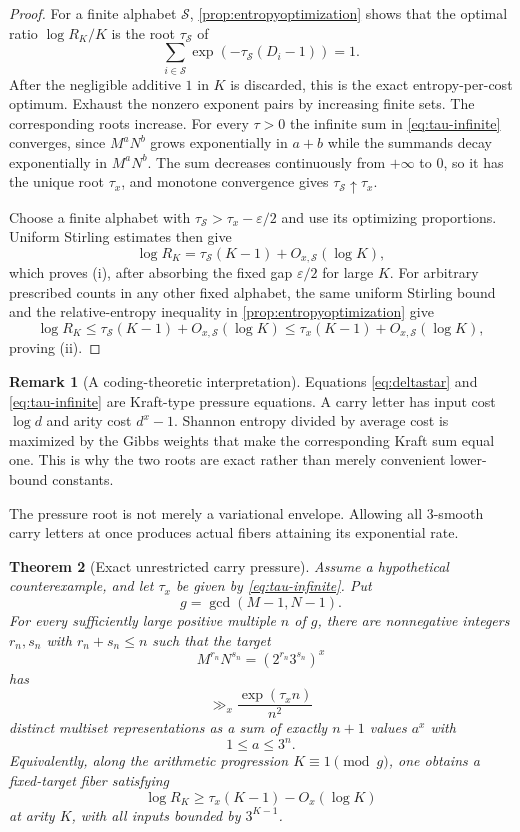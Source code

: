 \documentclass[11pt,oneside]{article}
\newtheorem{theorem}{Theorem}[section]
\theoremstyle{definition}
\newtheorem{remark}[theorem]{Remark}
\begin{document}
\begin{proof}
For a finite alphabet $\mathcal S$, \cref{prop:entropyoptimization} shows that the optimal ratio $\log R_K/K$ is the root $\tau_{\mathcal S}$ of
\[
       \sum_{i\in\mathcal S}
          \exp\!\left(-\tau_{\mathcal S}(D_i-1)\right)=1.
\]
After the negligible additive $1$ in $K$ is discarded, this is the exact entropy-per-cost optimum.  Exhaust the nonzero exponent pairs by increasing finite sets.  The corresponding roots increase.  For every $\tau>0$ the infinite sum in \eqref{eq:tau-infinite} converges, since $M^aN^b$ grows exponentially in $a+b$ while the summands decay exponentially in $M^aN^b$.  The sum decreases continuously from $+\infty$ to $0$, so it has the unique root $\tau_x$, and monotone convergence gives $\tau_{\mathcal S}\uparrow\tau_x$.

Choose a finite alphabet with $\tau_{\mathcal S}>\tau_x-\varepsilon/2$ and use its optimizing proportions.  Uniform Stirling estimates then give
\[
       \log R_K=\tau_{\mathcal S}(K-1)+O_{x,\mathcal S}(\log K),
\]
which proves (i), after absorbing the fixed gap $\varepsilon/2$ for large $K$.  For arbitrary prescribed counts in any other fixed alphabet, the same uniform Stirling bound and the relative-entropy inequality in \cref{prop:entropyoptimization} give
\[
       \log R_K\le\tau_{\mathcal S}(K-1)+O_{x,\mathcal S}(\log K)
       \le\tau_x(K-1)+O_{x,\mathcal S}(\log K),
\]
proving (ii).
\end{proof}

\begin{remark}[A coding-theoretic interpretation]
Equations \eqref{eq:deltastar} and \eqref{eq:tau-infinite} are Kraft-type pressure equations.  A carry letter has input cost $\log d$ and arity cost $d^x-1$.  Shannon entropy divided by average cost is maximized by the Gibbs weights that make the corresponding Kraft sum equal one.  This is why the two roots are exact rather than merely convenient lower-bound constants.
\end{remark}

The pressure root is not merely a variational envelope.  Allowing all $3$-smooth carry letters at once produces actual fibers attaining its exponential rate.

\begin{theorem}[Exact unrestricted carry pressure]\label{thm:globalcarrypressure}
Assume a hypothetical counterexample, and let $\tau_x$ be given by \eqref{eq:tau-infinite}.  Put
\[
       g=\gcd(M-1,N-1).
\]
For every sufficiently large positive multiple $n$ of $g$, there are nonnegative integers $r_n,s_n$ with $r_n+s_n\le n$ such that the target
\[
       M^{r_n}N^{s_n}=(2^{r_n}3^{s_n})^x
\]
has
\begin{equation}\label{eq:global-pressure-fiber}
       \gg_x \frac{\exp(\tau_x n)}{n^2}
\end{equation}
distinct multiset representations as a sum of exactly $n+1$ values $a^x$ with
\[
       1\le a\le 3^n.
\]
Equivalently, along the arithmetic progression $K\equiv1\pmod g$, one obtains a fixed-target fiber satisfying
\[
       \log R_K\ge \tau_x(K-1)-O_x(\log K)
\]
at arity $K$, with all inputs bounded by $3^{K-1}$.
\end{theorem}
\end{document}
